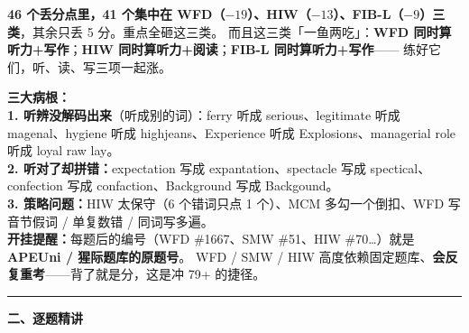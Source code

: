 \documentclass[11pt]{article}
\newcommand{\ptesub}[1]{%
  \par\needspace{2\baselineskip}\smallskip
  {\color{cAccent}\rule[-0.2ex]{3pt}{1.05em}}\hspace{6pt}%
  {\bfseries\color{cHead}#1}\par\nopagebreak\smallskip}
\begin{document}
\textbf{46 个丢分点里，41 个集中在 WFD（$-19$）、HIW（$-13$）、FIB-L（$-9$）三类}，其余只丢 5 分。重点全砸这三类。
而且这三类「一鱼两吃」：\textbf{WFD 同时算听力+写作}；\textbf{HIW 同时算听力+阅读}；\textbf{FIB-L 同时算听力+写作}——
练好它们，听、读、写三项一起涨。

\begin{notebox}\small
\textbf{三大病根：}\\
\textbf{1. 听辨没解码出来}（听成别的词）：ferry 听成 serious、legitimate 听成 magenal、hygiene 听成 highjeans、Experience 听成 Explosions、managerial role 听成 loyal raw lay。\\
\textbf{2. 听对了却拼错：}expectation 写成 expantation、spectacle 写成 spectical、confection 写成 confaction、Background 写成 Backgound。\\
\textbf{3. 策略问题：}HIW 太保守（6 个错词只点 1 个）、MCM 多勾一个倒扣、WFD 写音节假词 / 单复数错 / 同词写多遍。\\[2pt]
\textbf{开挂提醒：}每题后的编号（WFD \#1667、SMW \#51、HIW \#70…）就是 \textbf{APEUni / 猩际题库的原题号}。
WFD / SMW / HIW 高度依赖固定题库、\textbf{会反复重考}——背了就是分，这是冲 79+ 的捷径。
\end{notebox}

\ptesub{二、逐题精讲}
\end{document}
